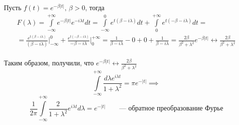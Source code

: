 \begin{example}
Пусть $f(t)=e^{-\beta|t|},\, \beta>0$, тогда
$$
\begin{array}{ll}
	F(\lambda)=\int\limits_{-\infty}^{+\infty}e^{-\beta|t|}e^{-i\lambda t}dt=\int\limits_{-\infty}^{0}e^{t(\beta-i\lambda)}dt+\int\limits_{0}^{+\infty}e^{t(-\beta-i\lambda)}dt=\\
	= \frac{e^{t(\beta-i\lambda)}}{(\beta-i\lambda)} \bigg|_{-\infty}^{0} +\frac{e^{t(-\beta-i\lambda)}}{-\beta-i\lambda} \bigg|_{0}^{+\infty}=\frac{1}{\beta-i\lambda}-0+0+\frac{1}{\beta-i\lambda}
	= \frac{2\beta}{\beta^2+\lambda^2} e^{-\beta|t|} \leftrightarrow \frac{2\beta}{\beta^2+\lambda^2}
\end{array}
$$\\
Таким образом, получили, что $e^{-\beta|t|} \leftrightarrow \frac{2\beta}{\beta^2+\lambda^2}$
$$
	\int\limits_{-\infty}^{+\infty}\frac{d\lambda e^{i\lambda t}}{1 + \lambda^2}=\pi e^{-|t|} \implies
$$
$$
	\frac{1}{2\pi}\int\limits_{-\infty}^{+\infty}\frac{2}{1+\lambda^2}e^{i\lambda t}d\lambda=e^{-|t|} \qquad \text{--- обратное преобразование Фурье}
$$

\end{example}